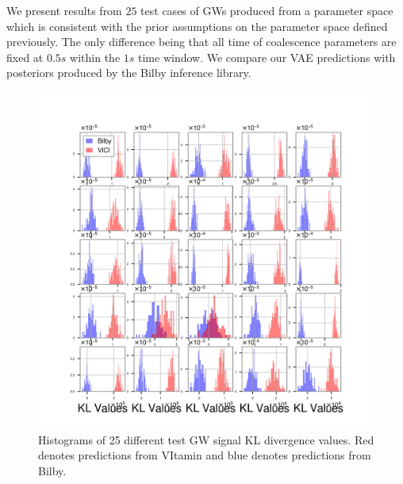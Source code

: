 \documentclass[%
showpacs,
 amsmath,amssymb,
 aps,
 twocolumn,
 prl,
 reprint,
floatfix,
]{revtex4-1}
\begin{document}
%
%
We present results from $25$ test cases of GWs produced from 
a parameter space which is consistent with the prior assumptions  
on the parameter space defined previously. The only difference 
being that all time of coalescence parameters are fixed 
at $0.5s$ within the $1s$ time window. We compare our 
VAE predictions with posteriors produced by the Bilby
inference library.

%
%
\begin{figure}
    \includegraphics[width=\columnwidth]{images/hist-kl_0.png}
    \caption{\label{fig:kl_results} Histograms of 
    25 different test GW signal KL divergence values. 
    Red denotes predictions from VItamin and blue 
    denotes predictions from Bilby.}
\end{figure}
\end{document}
